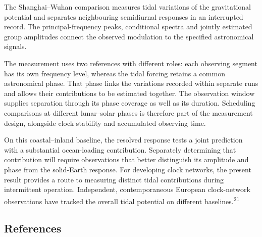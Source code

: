 \documentclass[
  12pt,
  a4paper,
]{article}
\begin{document}
The Shanghai--Wuhan comparison measures tidal variations of the
gravitational potential and separates neighbouring semidiurnal responses
in an interrupted record. The principal-frequency peaks, conditional
spectra and jointly estimated group amplitudes connect the observed
modulation to the specified astronomical signals.

The measurement uses two references with different roles: each observing
segment has its own frequency level, whereas the tidal forcing retains a
common astronomical phase. That phase links the variations recorded
within separate runs and allows their contributions to be estimated
together. The observation window supplies separation through its phase
coverage as well as its duration. Scheduling comparisons at different
lunar--solar phases is therefore part of the measurement design,
alongside clock stability and accumulated observing time.

On this coastal--inland baseline, the resolved response tests a joint
prediction with a substantial ocean-loading contribution. Separately
determining that contribution will require observations that better
distinguish its amplitude and phase from the solid-Earth response. For
developing clock networks, the present result provides a route to
measuring distinct tidal contributions during intermittent operation.
Independent, contemporaneous European clock-network observations have
tracked the overall tidal potential on different
baselines.\textsuperscript{21}

\clearpage

\singlespacing\fontsize{11}{13}\selectfont

\hypertarget{references}{%
\subsection{References}\label{references}}
\end{document}
